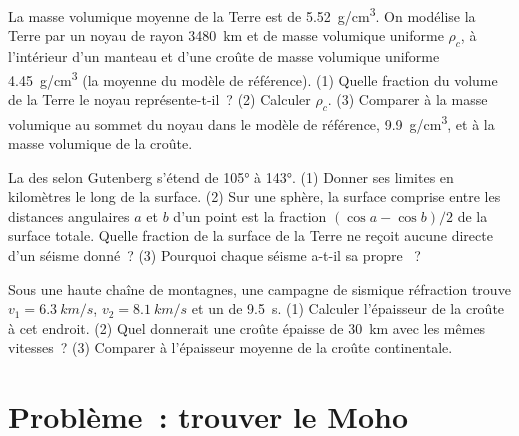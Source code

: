 \begin{exercise}[$\star\star\star$]\label{exo:g11:seismic-structure:13}
La masse volumique moyenne de la Terre est de \qty{5.52}{g/cm^3}. On
modélise la Terre par un noyau de rayon \qty{3480}{km} et de masse
volumique uniforme $\rho_c$, à l'intérieur d'un manteau et d'une croûte de
masse volumique uniforme \qty{4.45}{g/cm^3} (la moyenne du modèle de
référence). (1) Quelle fraction du volume de la Terre le noyau
représente-t-il~? (2) Calculer $\rho_c$. (3) Comparer à la masse volumique
au sommet du noyau dans le modèle de référence, \qty{9.9}{g/cm^3}, et à la
masse volumique de la croûte.
\end{exercise}

\begin{exercise}[$\star\star\star$]\label{exo:g11:seismic-structure:14}
La  des  selon Gutenberg s'étend de \ang{105} à
\ang{143}. (1) Donner ses limites en kilomètres le long de la surface.
(2) Sur une sphère, la surface comprise entre les distances angulaires $a$
et $b$ d'un point est la fraction $(\cos a - \cos
b)/2$ de la surface totale. Quelle fraction de la surface de la Terre ne
reçoit aucune  directe d'un séisme donné~? (3) Pourquoi chaque séisme
a-t-il sa propre ~?
\end{exercise}

\begin{exercise}[$\star\star\star$]\label{exo:g11:seismic-structure:15}
Sous une haute chaîne de montagnes, une campagne de sismique réfraction
trouve $v_1 =
\qty{6.3}{km/s}$, $v_2 = \qty{8.1}{km/s}$ et un  de
\qty{9.5}{s}. (1) Calculer l'épaisseur de la croûte à cet endroit.
(2) Quel  donnerait une croûte épaisse de \qty{30}{km}
avec les mêmes vitesses~? (3) Comparer à l'épaisseur moyenne de la croûte
continentale.
\end{exercise}

\section{Problème~: trouver le Moho}

